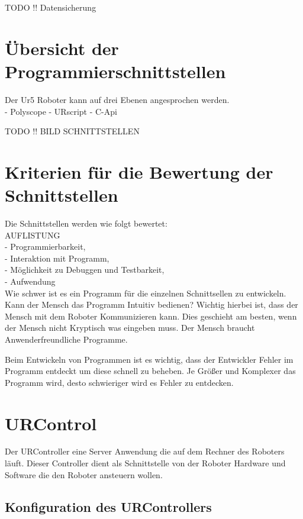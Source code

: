 TODO !! Datensicherung

\section{Übersicht der Programmierschnittstellen}
\label{sec:programm_api_uebersicht_gru}

Der Ur5 Roboter kann auf drei Ebenen angesprochen werden.\\
- Polyscope
- URscript
- C-Api

TODO !! BILD SCHNITTSTELLEN


\section{Kriterien für die Bewertung der Schnittstellen}
\label{sec:criterias_of_solutions_kon}

Die Schnittstellen werden wie folgt bewertet:
\\
AUFLISTUNG \\
- Programmierbarkeit,\\
- Interaktion mit Programm, \\
- Möglichkeit zu Debuggen und Testbarkeit,\\
- Aufwendung\\

Wie schwer ist es ein Programm für die einzelnen Schnittsellen zu entwickeln.
Kann der Mensch das Programm Intuitiv bedienen? Wichtig hierbei ist, dass der Mensch mit dem Roboter Kommunizieren kann. Dies geschieht am besten, wenn der Mensch nicht Kryptisch was eingeben muss. Der Mensch braucht Anwenderfreundliche Programme.

Beim Entwickeln von Programmen ist es wichtig, dass der Entwickler Fehler im Programm entdeckt um diese schnell zu beheben.
Je Größer und Komplexer das Programm wird, desto schwieriger wird es Fehler zu entdecken.


\section{URControl}
\label{sec:ur_control_gru}

Der URController eine Server Anwendung die auf dem Rechner des Roboters läuft. 
Dieser Controller dient als Schnittstelle von der Roboter Hardware und Software die den Roboter ansteuern wollen.

\subsection{Konfiguration des URControllers}
\label{urcontrol_rci_gru}

